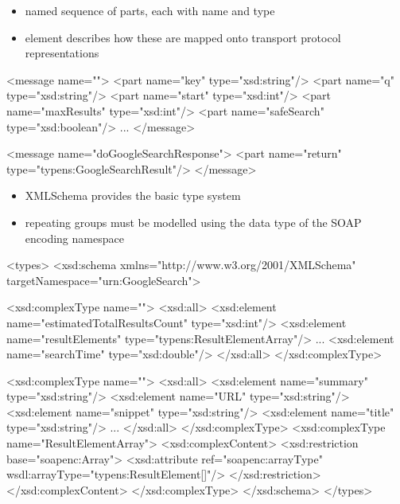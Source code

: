 \documentclass{sepslide-soa-faked} %
\begin{document}
\begin{slide}
	\begin{itemize}
	\item named sequence of parts, each with name and type
	\item {} element describes how these are mapped onto
		transport protocol representations
	\end{itemize}

\begin{xml}
<message name="">
  <part name="key"            type="xsd:string"/>
  <part name="q"              type="xsd:string"/>
  <part name="start"          type="xsd:int"/>
  <part name="maxResults"     type="xsd:int"/>
  <part name="safeSearch"     type="xsd:boolean"/>
  ...
</message>

<message name="doGoogleSearchResponse">
  <part name="return"         type="typens:GoogleSearchResult"/>           
</message>
\end{xml}
\end{slide}
	
\begin{slide}

	\begin{itemize}
	\item XMLSchema provides the basic type system
	\item repeating groups must be modelled using the 
		data type of the SOAP encoding namespace
	\end{itemize}
\begin{xml}
<types> <xsd:schema xmlns="http://www.w3.org/2001/XMLSchema" 
                    targetNamespace="urn:GoogleSearch">

  <xsd:complexType name="">
    <xsd:all>
      <xsd:element name="estimatedTotalResultsCount" type="xsd:int"/>
      <xsd:element name="resultElements" 
                   type="typens:ResultElementArray"/>
      ...
      <xsd:element name="searchTime" type="xsd:double"/>
    </xsd:all>
  </xsd:complexType>
\end{xml}\end{slide}\begin{slide}\begin{xml}
  <xsd:complexType name="">
    <xsd:all>
      <xsd:element name="summary" type="xsd:string"/>
      <xsd:element name="URL" type="xsd:string"/>
      <xsd:element name="snippet" type="xsd:string"/>
      <xsd:element name="title" type="xsd:string"/>
      ...
    </xsd:all>
  </xsd:complexType>
  <xsd:complexType name="ResultElementArray">
    <xsd:complexContent>
      <xsd:restriction base="soapenc:Array">
        <xsd:attribute ref="soapenc:arrayType" 
          wsdl:arrayType="typens:ResultElement[]"/>
      </xsd:restriction>
    </xsd:complexContent>
  </xsd:complexType>
</xsd:schema> </types>
\end{xml}\end{slide}
\end{document}
